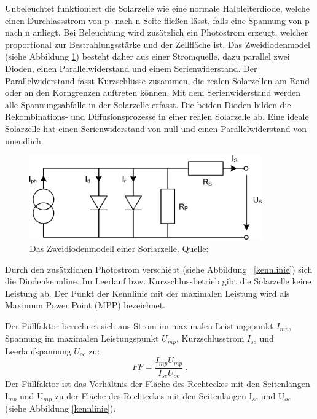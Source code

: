 \documentclass[a4paper,bibtotoc,oneside]{scrbook}
\begin{document}
Unbeleuchtet funktioniert die Solarzelle wie eine normale Halbleiterdiode, welche einen Durchlassstrom von p- nach n-Seite fließen lässt, falls eine Spannung von p nach n anliegt. Bei Beleuchtung wird zusätzlich ein Photostrom erzeugt, welcher proportional zur Bestrahlungsstärke und der Zellfläche ist. Das Zweidiodenmodel (siehe Abbildung \ref{esb}) besteht daher aus einer Stromquelle, dazu parallel zwei Dioden, einen Parallelwiderstand und einem Serienwiderstand. Der Parallelwiderstand fasst Kurzschlüsse zusammen, die realen Solarzellen am Rand oder an den Korngrenzen auftreten können. Mit dem Serienwiderstand werden alle Spannungsabfälle in der Solarzelle erfasst. Die beiden Dioden bilden die Rekombinations- und Diffusionsprozesse in einer realen Solarzelle ab. Eine ideale Solarzelle hat einen Serienwiderstand von null und einen Parallelwiderstand von unendlich. 
\begin{figure}[htbp]
\centering
\includegraphics[width=100mm]{img/esb2.png}
\caption{Das Zweidiodenmodell einer Sorlarzelle. Quelle: \cite{pv}}\label{esb}
\end{figure}

Durch den zusätzlichen Photostrom verschiebt (siehe Abbildung ~\ref{kennlinie}) sich die Diodenkennline. Im Leerlauf  bzw. Kurzschlussbetrieb gibt die Solarzelle keine Leistung ab. Der Punkt der Kennlinie mit der maximalen Leistung wird als Maximum Power Point (MPP) bezeichnet.

Der Füllfaktor berechnet sich aus Strom im maximalen Leistungspunkt $I_{mp}$, Spannung im maximalen Leistungspunkt $U_{mp}$, Kurzschlusstrom $I_{sc}$ und Leerlaufspannung $U_{oc}$ zu:
  \begin{equation}
     FF = \frac {I_{mp} U_{mp}} {I_{sc} U_{oc}}~.
  \end{equation}
Der Füllfaktor ist das Verhältnis der Fläche des Rechteckes mit den Seitenlängen I$_{mp}$ und U$_{mp}$ zu der Fläche des Rechteckes mit den Seitenlängen I$_{sc}$ und U$_{oc}$ (siehe Abbildung \ref{kennlinie}).
\end{document}
